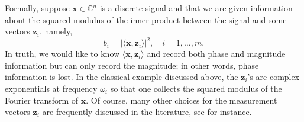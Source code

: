 \documentclass[11pt]{article}
\newcommand{\C}{\mathbb{C}}
\newcommand{\<}{\langle}
\renewcommand{\>}{\rangle}
\newcommand{\bx}{\bm{x}}
\newcommand{\bz}{\bm{z}}
\numberwithin{equation}{section}
\newcommand{\ejc}[1]{\textcolor{red}{#1}}
\newcommand{\vv}[1]{\textcolor{green}{#1}}
\begin{document}


Formally, suppose $\bx \in \C^n$ is a discrete signal and that we are
given information about the squared modulus of the inner product
between the signal and some vectors $\bz_i$, namely, 
\begin{equation}
\label{eq:data}
b_i = |\<\bx,\bz_i\>|^2, \quad i = 1, \ldots, m.
\end{equation}
In truth, we would like to know $\<\bx,\bz_i\>$ and record both phase and
magnitude information but can only record the magnitude; in other
words, phase information is lost.  In the classical example discussed
above, the $\bz_i$'s are complex exponentials at frequency $\omega_i$ so
that one collects the squared modulus of the Fourier transform of $\bx$.
Of course, many other choices for the measurement vectors $\bz_i$ are
frequently discussed in the literature, see \cite{Fin04,BBC09} for
instance.

\end{document}
